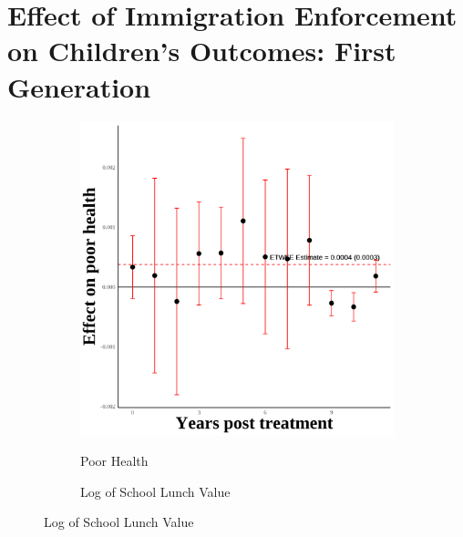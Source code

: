 \documentclass[12pt,english]{article}
\begin{document}
\pagebreak

\section{Effect of Immigration Enforcement on Children's Outcomes: First Generation}
\begin{figure}[H]
  \caption{Effect of Immigration Enforcement on Children's Outcomes: First Generation}
  \centering

  \begin{subfigure}[b]{0.3\textwidth}
    \centering
    \caption{Poor Health}
    \includegraphics[width=\linewidth]{figures/plot09-poor_health_event_study-first.png}
    \label{fig:poor-health-first}
  \end{subfigure}
  \hfill
  \begin{subfigure}[b]{0.3\textwidth}
    \centering
    \caption{Log of School Lunch Value}

\end{subfigure}
\end{figure}
\end{document}
